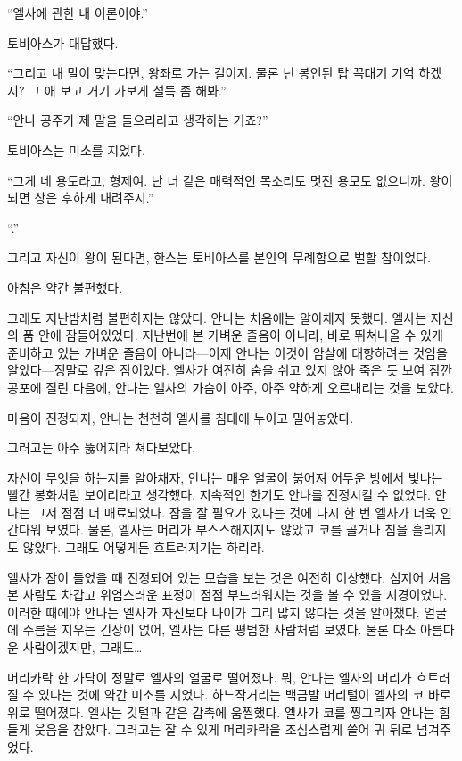 ``엘사에 관한 내 이론이야.''

토비아스가 대답했다.

``그리고 내 말이 맞는다면, 왕좌로 가는 길이지. 물론 넌 봉인된 탑 꼭대기 기억 하겠지? 그 애 보고 거기 가보게 설득 좀 해봐.''

``안나 공주가 제 말을 들으리라고 생각하는 거죠?''

토비아스는 미소를 지었다.

``그게 네 용도라고, 형제여. 난 너 같은 매력적인 목소리도 멋진 용모도 없으니까. 왕이 되면 상은 후하게 내려주지.''

``.''

그리고 자신이 왕이 된다면, 한스는 토비아스를 본인의 무례함으로 벌할 참이었다.

\textbreak

아침은 약간 불편했다.

그래도 지난밤처럼 불편하지는 않았다. 안나는 처음에는 알아채지 못했다. 엘사는 자신의 품 안에 잠들어있었다. 지난번에 본 가벼운 졸음이 아니라, 바로 뛰쳐나올 수 있게 준비하고 있는 가벼운 졸음이 아니라—이제 안나는 이것이 암살에 대항하려는 것임을 알았다—정말로 깊은 잠이었다. 엘사가 여전히 숨을 쉬고 있지 않아 죽은 듯 보여 잠깐 공포에 질린 다음에, 안나는 엘사의 가슴이 아주, 아주 약하게 오르내리는 것을 보았다.

마음이 진정되자, 안나는 천천히 엘사를 침대에 누이고 밀어놓았다.

그러고는 아주 뚫어지라 쳐다보았다.

자신이 무엇을 하는지를 알아채자, 안나는 매우 얼굴이 붉어져 어두운 방에서 빛나는 빨간 봉화처럼 보이리라고 생각했다. 지속적인 한기도 안나를 진정시킬 수 없었다. 안나는 그저 점점 더 매료되었다. 잠을 잘 필요가 있다는 것에 다시 한 번 엘사가 더욱 인간다워 보였다. 물론, 엘사는 머리가 부스스해지지도 않았고 코를 골거나 침을 흘리지도 않았다. 그래도 어떻게든 흐트러지기는 하리라.

엘사가 잠이 들었을 때 진정되어 있는 모습을 보는 것은 여전히 이상했다. 심지어 처음 본 사람도 차갑고 위엄스러운 표정이 점점 부드러워지는 것을 볼 수 있을 지경이었다. 이러한 때에야 안나는 엘사가 자신보다 나이가 그리 많지 않다는 것을 알아챘다. 얼굴에 주름을 지우는 긴장이 없어, 엘사는 다른 평범한 사람처럼 보였다. 물론 다소 아름다운 사람이겠지만, 그래도\ldots

머리카락 한 가닥이 정말로 엘사의 얼굴로 떨어졌다. 뭐, 안나는 엘사의 머리가 흐트러질 수 있다는 것에 약간 미소를 지었다. 하느작거리는 백금발 머리털이 엘사의 코 바로 위로 떨어졌다. 엘사는 깃털과 같은 감촉에 움찔했다. 엘사가 코를 찡그리자 안나는 힘들게 웃음을 참았다. 그러고는 잘 수 있게 머리카락을 조심스럽게 쓸어 귀 뒤로 넘겨주었다.


